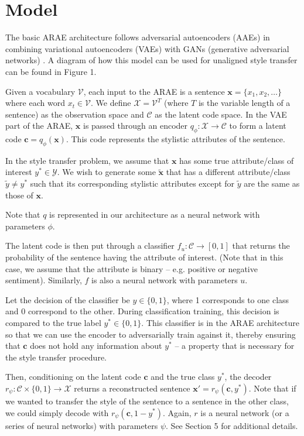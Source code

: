 \documentclass{article}
\newcommand{\vect}[1]{\boldsymbol{#1}}
\begin{document}
\section{Model} 

The basic ARAE architecture follows adversarial autoencoders (AAEs) in combining variational autoencoders (VAEs) with GANs (generative adversarial networks) \cite{arae}.  A diagram of how this model can be used for unaligned style transfer can be found in Figure 1.

Given a vocabulary $\mathcal{V}$, each input to the ARAE is a sentence $\vect{x} = \{x_1, x_2, \ldots\}$ where each word $x_t \in \mathcal{V}$.  We define $\mathcal{X} = \mathcal{V}^T$ (where $T$ is the variable length of a sentence) as the observation space and $\mathcal{C}$ as the latent code space.  In the VAE part of the ARAE, $\vect{x}$ is passed through an encoder $q_\phi : \mathcal{X} \to \mathcal{C}$ to form a latent code $\vect{c} = q_\phi(\vect{x})$.  This code represents the stylistic attributes of the sentence.  

In the style transfer problem, we assume that $\vect{x}$ has some true attribute/class of interest $y^* \in \mathcal{Y}$.  We wish to generate some $\tilde{\vect{x}}$ that has a different attribute/class $\tilde{y} \neq y^*$ such that its corresponding stylistic attributes except for $\tilde{y}$ are the same as those of $\vect{x}$.

Note that $q$ is represented in our architecture as a neural network with parameters $\phi$.

The latent code is then put through a classifier $f_u : \mathcal{C} \to [0, 1]$ that returns the probability of the sentence having the attribute of interest.  (Note that in this case, we assume that the attribute is binary -- e.g. positive or negative sentiment).  Similarly, $f$ is also a neural network with parameters $u$.  

Let the decision of the classifier be $y \in \{0, 1\}$, where 1 corresponds to one class and 0 correspond to the other.  During classification training, this decision is compared to the true label $y^* \in \{0, 1\}$.  This classifier is in the ARAE architecture so that we can use the encoder to adversarially train against it, thereby ensuring that $\vect{c}$ does not hold any information about $y^*$ -- a property that is necessary for the style transfer procedure.  

Then, conditioning on the latent code $\vect{c}$ and the true class $y^*$, the decoder $r_\psi : \mathcal{C} \times \{0, 1\} \to \mathcal{X}$ returns a reconstructed sentence $\vect{x}' = r_\psi(\vect{c}, y^*)$.  Note that if we wanted to transfer the style of the sentence to a sentence in the other class, we could simply decode with $r_\psi(\vect{c}, 1 - y^*)$.  Again, $r$ is a neural network (or a series of neural networks) with parameters $\psi$.  See Section 5 for additional details.      
\end{document}
